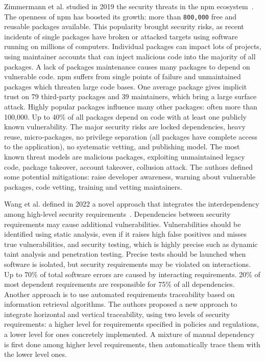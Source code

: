 Zimmermann et al. studied in 2019 the security threats in the \gls{npm} ecosystem~\cite{zimmermann_small_2019}. The openness of \gls{npm} has boosted its growth: more than \texttt{800,000} free and reusable packages available. This popularity brought security risks, as recent incidents of single packages have broken or attacked targets using software running on millions of computers. Individual packages can impact lots of projects, using maintainer accounts that can inject malicious code into the majority of all packages. A lack of packages maintenance causes many packages to depend on vulnerable code. \gls{npm} suffers from single points of failure and unmaintained packages which threaten large code bases. One average package gives implicit trust on 79 third-party packages and 39 maintainers, which bring a large surface attack. Highly popular packages influence many other packages: often more than 100,000. Up to 40\% of all packages depend on code with at least one publicly known vulnerability. The major security risks are locked dependencies, heavy reuse, micro-packages, no privilege separation (all packages have complete access to the application), no systematic vetting, and publishing model. The most known threat models are malicious packages, exploiting unmaintained legacy code, package takeover, account takeover, collusion attack. The authors defined some potential mitigations: raise developer awareness, warning about vulnerable packages, code vetting, training and vetting maintainers. %

Wang et al. defined in 2022 a novel approach that integrates the interdependency among high-level security requirements~\cite{wang_detecting_2022}. Dependencies between security requirements may cause additional vulnerabilities. Vulnerabilities should be identified using static analysis, even if it raises high false positives and misses true vulnerabilities, and security testing, which is highly precise such as dynamic taint analysis and penetration testing. Precise tests should be launched when software is isolated, but security requirements may be violated on interactions. Up to 70\% of total software errors are caused by interacting requirements. 20\% of most dependent requirements are responsible for 75\% of all dependencies. Another approach is to use automated requirements traceability based on information retrieval algorithms. The authors proposed a new approach to integrate horizontal and vertical traceability, using two levels of security requirements: a higher level for requirements specified in policies and regulations, a lower level for ones concretely implemented. A mixture of manual dependency is first done among higher level requirements, then automatically trace them with the lower level ones. %

